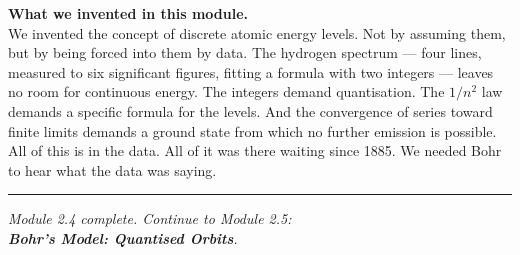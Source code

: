 \documentclass[12pt, a4paper]{book}
\begin{document}
\vspace{1.5em}
\begin{center}
\begin{tcolorbox}[enhanced, colback=DiscoveryColor!8, colframe=DiscoveryColor,
  width=0.88\textwidth, arc=3pt]
\centering\sffamily\small
\textbf{What we invented in this module.}\\[4pt]
We invented the concept of discrete atomic energy levels.
Not by assuming them, but by being forced into them by data.
The hydrogen spectrum --- four lines, measured to six significant
figures, fitting a formula with two integers --- leaves no room
for continuous energy.
The integers demand quantisation.
The $1/n^2$ law demands a specific formula for the levels.
And the convergence of series toward finite limits demands
a ground state from which no further emission is possible.
All of this is in the data.
All of it was there waiting since 1885.
We needed Bohr to hear what the data was saying.
\end{tcolorbox}
\end{center}

\vspace{2em}
\noindent\textcolor{JourneyColor!40}{\rule{\textwidth}{0.6pt}}
\begin{center}
\textit{\sffamily\small
Module 2.4 complete. Continue to Module 2.5:\\
\textbf{Bohr's Model: Quantised Orbits}.}
\end{center}
\end{document}
